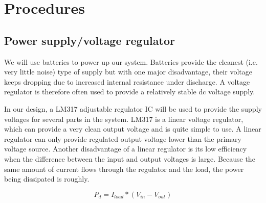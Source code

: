 \documentclass[letterpaper, 11pt]{article}
\begin{document}

\section{Procedures}

\subsection{Power supply/voltage regulator}

We will use batteries to power up our system. Batteries provide the cleanest (i.e. very little noise) type of supply but with one major disadvantage, their voltage keeps dropping due to increased internal resistance under discharge. A voltage regulator is therefore often used to provide a relatively stable dc voltage supply.

In our design, a LM317 adjustable regulator IC will be used to provide the supply voltages for several parts in the system. LM317 is a linear voltage regulator, which can provide a very clean output voltage and is quite simple to use. A linear regulator can only provide regulated output voltage lower than the primary voltage source. Another disadvantage of a linear regulator is its low efficiency when the difference between the input and output voltages is large. Because the same amount of current flows through the regulator and the load, the power being dissipated is roughly.

\begin{equation}
	P_d=I_{load}*\left( V_{in}-V_{out}\right)
\end{equation}
\end{document}

